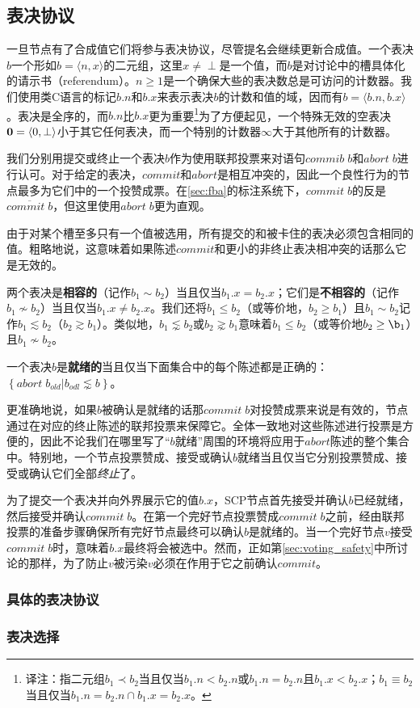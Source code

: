 \subsection{表决协议}
一旦节点有了合成值它们将参与表决协议，尽管提名会继续更新合成值。一个表决$b$一个形如$b=\langle n,x\rangle$的二元组，这里$x\neq \perp$是一个值，而$b$是对讨论中的槽具体化的请示书（referendum）。$n\geq 1$是一个确保大些的表决数总是可访问的计数器。我们使用类C语言的标记$b.n$和$b.x$来表示表决$b$的计数和值的域，因而有$b=\langle b.n, b.x\rangle$。表决是全序的，而$b.n$比$b.x$更为重要{\footnote{译注：指二元组$b_1\prec b_2$当且仅当$b_1.n < b_2.n$或$b_1.n=b_2.n $且$b_1.x < b_2.x$；$b_1\equiv b_2$当且仅当$b_1.n=b_2.n\cap b_1.x=b_2.x$。}}为了方便起见，一个特殊无效的空表决${\bm 0}=\langle 0,\perp\rangle$小于其它任何表决，而一个特别的计数器$\infty$大于其他所有的计数器。

我们分别用提交或终止一个表决$b$作为使用联邦投票来对语句$commib\;b$和$abort\;b$进行认可。对于给定的表决，$commit$和$abort$是相互冲突的，因此一个良性行为的节点最多为它们中的一个投赞成票。在\ref{sec:fba}的标注系统下，$commit\;b$的反是$\overline{commit\;b}$，但这里使用$abort\;b$更为直观。

由于对某个槽至多只有一个值被选用，所有提交的和被卡住的表决必须包含相同的值。粗略地说，这意味着如果陈述$commit$和更小的非终止表决相冲突的话那么它是无效的。

\begin{definition}[相容的]
	两个表决是\textbf{相容的}（记作$b_1 \sim b_2$）当且仅当$b_1.x=b_2.x$；它们是\textbf{不相容的}（记作$b_1\not\sim b_2$）当且仅当$b_1.x\neq b_2.x$。我们还将$b_1\leq b_2$（或等价地，$b_2\geq b_1$）且$b_1\sim b_2$记作$b_1\lesssim b_2$（$b_2\gtrsim b_1$）。类似地，$b_1\lnsim b_2$或$b_2\gnsim b_1$意味着$b_1\leq b_2$（或等价地$b_2\geq \b_1$）且$b_1\not\sim b_2$。
\end{definition}

\begin{definition}[就绪的]
	一个表决$b$是\textbf{就绪的}当且仅当下面集合中的每个陈述都是正确的：$\left\{abort\;b_{old}|b_{odl}\lnsim b\right\}$。
\end{definition}

更准确地说，如果$b$被确认是就绪的话那$commit\;b$对投赞成票来说是有效的，节点通过在对应的终止陈述的联邦投票来保障它。全体一致地对这些陈述进行投票是方便的，因此不论我们在哪里写了``$b$就绪''周围的环境将应用于$abort$陈述的整个集合中。特别地，一个节点投票赞成、接受或确认$b$就绪当且仅当它分别投票赞成、接受或确认它们全部\textit{终止}了。

为了提交一个表决并向外界展示它的值$b.x$，SCP节点首先接受并确认$b$已经就绪，然后接受并确认$commit\;b$。在第一个完好节点投票赞成$commit\;b$之前，经由联邦投票的准备步骤确保所有完好节点最终可以确认$b$是就绪的。当一个完好节点$v$接受$commit\;b$时，意味着$b.x$最终将会被选中。然而，正如第\ref{sec:voting_safety}中所讨论的那样，为了防止$v$被污染$v$必须在作用于它之前确认$commit$。

\subsubsection{具体的表决协议}

\subsubsection{表决选择}